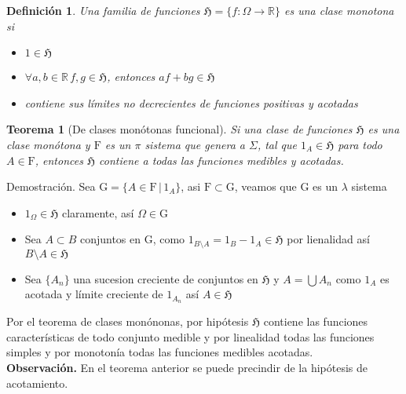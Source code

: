 \documentclass[letterpaper]{article}
\newtheorem{teorema}{Teorema}[section]
\newtheorem{def.}{Definici\'on}[section]
\newcommand{\obs}{{\newline \noindent \sc \textbf{Observación. }}}
\newcommand{\dem}{{\noindent \sc Demostraci\'on. }}
\newcommand{\re}{\ensuremath{\mathbb R }}
\begin{document}
\begin{def.}
    Una familia de funciones \(\mathfrak{H}=\{f:\Omega\rightarrow\re\}\) es una clase monotona si
\begin{itemize}
\item \(1\in\mathfrak{H}\)
\item \(\forall a,b\in\re\,f,g\in\mathfrak{H}\), entonces \(af+bg\in\mathfrak{H}\)
\item contiene sus límites no decrecientes de funciones positivas y acotadas
\end{itemize}
\end{def.}
\begin{teorema}[De clases monótonas funcional]
Si una clase de funciones $\mathfrak{H}$ es una clase monótona y $\mathrm{F}$ es un $\pi$ sistema que genera a $\Sigma$, tal que $1_A\in\mathfrak{H}$ para todo $A\in\mathrm{F}$, entonces $\mathfrak{H}$ contiene a todas las funciones medibles y acotadas.
\end{teorema}
\dem Sea \(\mathrm{G}=\{A\in\mathrm{F}\,\vert\,1_A\}\), asi \(\mathrm{F}\subset\mathrm{G}\), veamos que \(\mathrm{G}\) es un \(\lambda\) sistema
\begin{itemize}
\item \(1_{\Omega}\in\mathfrak{H}\) claramente, así \(\Omega\in\mathrm{G}\)
\item Sea \(A\subset B\) conjuntos en \(\mathrm{G}\), como \(1_{B\setminus A}=1_B-1_A\in\mathfrak{H}\) por lienalidad así \(B\setminus A\in\mathfrak{H}\)
\item Sea \(\{A_n\}\) una sucesion creciente de conjuntos en \(\mathfrak{H}\) y \(A=\bigcup A_n\) como \(1_A\) es acotada y límite creciente de \(1_{A_n}\) así \(A\in\mathfrak{H}\)
\end{itemize}
Por el teorema de clases monónonas, por hipótesis \(\mathfrak{H}\) contiene las funciones características de todo conjunto medible y por linealidad todas las funciones simples y por monotonía todas las funciones medibles acotadas.\\\empty
\obs En el teorema anterior se puede precindir de la hipótesis de acotamiento.
\end{document}
